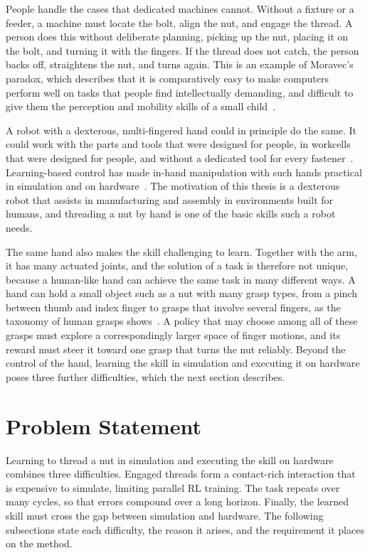 People handle the cases that dedicated machines cannot. Without a fixture or a feeder, a machine must locate the bolt, align the nut, and engage the thread. A person does this without deliberate planning, picking up the nut, placing it on the bolt, and turning it with the fingers. If the thread does not catch, the person backs off, straightens the nut, and turns again. This is an example of Moravec's paradox, which describes that it is comparatively easy to make computers perform well on tasks that people find intellectually demanding, and difficult to give them the perception and mobility skills of a small child~\cite{Moravec1988}.

A robot with a dexterous, multi-fingered hand could in principle do the same. It could work with the parts and tools that were designed for people, in workcells that were designed for people, and without a dedicated tool for every fastener~\cite{BicchiKumar2000,Weinberg2024}. Learning-based control has made in-hand manipulation with such hands practical in simulation and on hardware~\cite{Chen2021,Handa2024,Weinberg2024}. The motivation of this thesis is a dexterous robot that assists in manufacturing and assembly in environments built for humans, and threading a nut by hand is one of the basic skills such a robot needs.

The same hand also makes the skill challenging to learn. Together with the arm, it has many actuated joints, and the solution of a task is therefore not unique, because a human-like hand can achieve the same task in many different ways. A hand can hold a small object such as a nut with many grasp types, from a pinch between thumb and index finger to grasps that involve several fingers, as the taxonomy of human grasps shows~\cite{Feix2016}. A policy that may choose among all of these grasps must explore a correspondingly larger space of finger motions, and its reward must steer it toward one grasp that turns the nut reliably. Beyond the control of the hand, learning the skill in simulation and executing it on hardware poses three further difficulties, which the next section describes.

\section{Problem Statement}\label{sec:problem-setup}

Learning to thread a nut in simulation and executing the skill on hardware combines three difficulties. Engaged threads form a contact-rich interaction that is expensive to simulate, limiting parallel \ac{RL} training. The task repeats over many cycles, so that errors compound over a long horizon. Finally, the learned skill must cross the gap between simulation and hardware. The following subsections state each difficulty, the reason it arises, and the requirement it places on the method.

